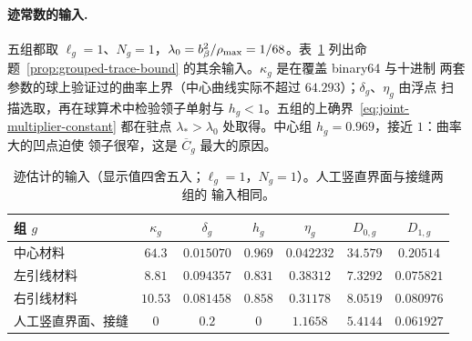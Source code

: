 \paragraph{迹常数的输入.}
五组都取 $\ell_g=1$、$N_g=1$，$\lambda_0=b_\beta^2/\rho_{\max}=1/68$。表~\ref{tab:results-trace}
列出命题~\ref{prop:grouped-trace-bound} 的其余输入。$\kappa_g$ 是在覆盖 binary64 与十进制
两套参数的球上验证过的曲率上界（中心曲线实际不超过 $64.293$）；$\delta_g$、$\eta_g$ 由浮点
扫描选取，再在球算术中检验领子单射与 $h_g<1$。五组的上确界~\eqref{eq:joint-multiplier-constant}
都在驻点 $\lambda_*>\lambda_0$ 处取得。中心组 $h_g=0.969$，接近 $1$：曲率大的凹点迫使
领子很窄，这是 $\overline C_g$ 最大的原因。
\begin{table}[htbp]
  \centering
  \caption{迹估计的输入（显示值四舍五入；$\ell_g=1$，$N_g=1$）。人工竖直界面与接缝两组的
  输入相同。}
  \label{tab:results-trace}
  \begin{tabular}{lcccccc}
    \toprule
    组 $g$ & $\kappa_g$ & $\delta_g$ & $h_g$ & $\eta_g$ & $D_{0,g}$ & $D_{1,g}$\\
    \midrule
    中心材料 & $64.3$ & $0.015070$ & $0.969$ & $0.042232$ & $34.579$ & $0.20514$\\
    左引线材料 & $8.81$ & $0.094357$ & $0.831$ & $0.38312$ & $7.3292$ & $0.075821$\\
    右引线材料 & $10.53$ & $0.081458$ & $0.858$ & $0.31178$ & $8.0519$ & $0.080976$\\
    人工竖直界面、接缝 & $0$ & $0.2$ & $0$ & $1.1658$ & $5.4144$ & $0.061927$\\
    \bottomrule
  \end{tabular}
\end{table}

